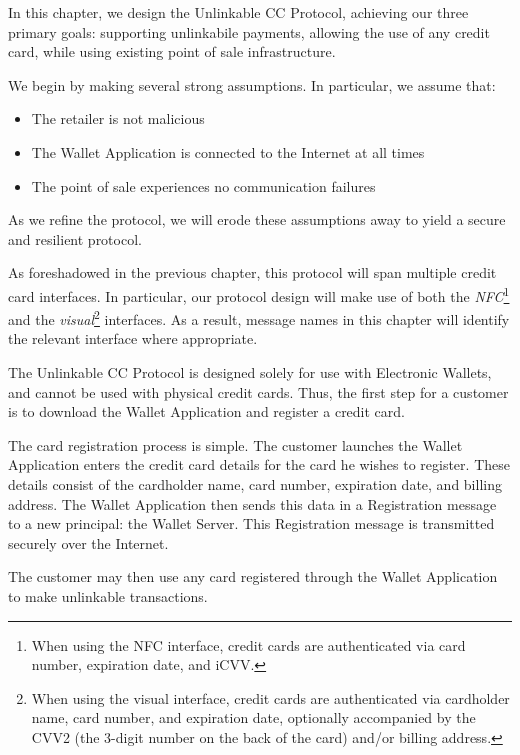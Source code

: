 In this chapter, we design the Unlinkable CC Protocol, achieving our three primary goals:
supporting unlinkabile payments,
allowing the use of any credit card,
while using existing point of sale infrastructure.

We begin by making several strong assumptions.
In particular, we assume that:
\begin{itemize}
\item The retailer is not malicious
\item The Wallet Application is connected to the Internet at all times
\item The point of sale experiences no communication failures
\end{itemize}
As we refine the protocol, we will erode these assumptions away to yield a secure and resilient protocol.

As foreshadowed in the previous chapter, this protocol will span multiple credit card interfaces.
In particular, our protocol design will make use of both the \emph{NFC}\footnote{
	When using the NFC interface, credit cards are authenticated via card number, expiration date, and iCVV.
} and the \emph{visual}\footnote{
	When using the visual interface, credit cards are authenticated via cardholder name, card number, and expiration date,
	optionally accompanied by the CVV2 (the 3-digit number on the back of the card) and/or billing address.
} interfaces.
As a result, message names in this chapter will identify the relevant interface where appropriate.

The Unlinkable CC Protocol is designed solely for use with Electronic Wallets, and cannot be used with physical credit cards.
Thus, the first step for a customer is to download the Wallet Application and register a credit card.

The card registration process is simple.
The customer launches the Wallet Application enters the credit card details for the card he wishes to register.
These details consist of the cardholder name, card number, expiration date, and billing address.
The Wallet Application then sends this data in a Registration message to a new principal: the Wallet Server.
This Registration message is transmitted securely over the Internet.

The customer may then use any card registered through the Wallet Application to make unlinkable transactions.
